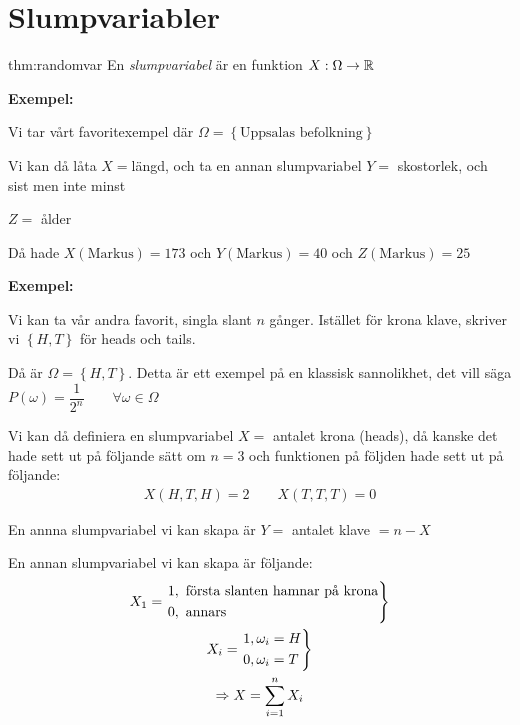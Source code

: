 \section{Slumpvariabler}
\par\bigskip
\begin{theo}[Slumpvariabel]{thm:randomvar}
  En \textit{slumpvariabel} är en funktion $X:\Omega\to\mathbb{R}$ 
\end{theo}
\par\bigskip
\noindent\textbf{Exempel:}\par
\noindent Vi tar vårt favoritexempel där $\Omega = \left\{\text{Uppsalas befolkning}\right\}$ \par
\noindent Vi kan då låta $X = $längd, och ta en annan slumpvariabel $Y = $ skostorlek, och sist men inte minst\par\noindent $Z =$ ålder\par
\noindent Då hade $X(\text{Markus}) = 173$ och $Y(\text{Markus}) = 40$ och $Z(\text{Markus})=25$
\par\bigskip
\noindent\textbf{Exempel:}\par
\noindent Vi kan ta vår andra favorit, singla slant $n$ gånger. Istället för krona klave, skriver vi $\left\{H,T\right\}$ för heads och tails.\par
\noindent Då är $\Omega = \left\{H,T\right\}$. Detta är ett exempel på en klassisk sannolikhet, det vill säga $P(\omega) = \dfrac{1}{2^n}\qquad\forall \omega\in\Omega$\par
\noindent Vi kan då definiera en slumpvariabel $X=$ antalet krona (heads), då kanske det hade sett ut på följande sätt om $n=3$ och funktionen på följden hade sett ut på följande:
\begin{equation*}
  \begin{gathered}
    X(H,T,H) = 2\qquad X(T,T,T) = 0
  \end{gathered}
\end{equation*}
\par\bigskip
\noindent En annna slumpvariabel vi kan skapa är $Y=$ antalet klave $=n-X$\par
\noindent En annan slumpvariabel vi kan skapa är följande:
\begin{equation*}
  \begin{gathered}
    X_1=
    \begin{rcases*}
      1,\text{ första slanten hamnar på krona}\\
      0, \text{ annars}
    \end{rcases*}\\
    X_i =
    \begin{rcases*}
      1, \omega_i = H\\
      0, \omega_i = T
    \end{rcases*}\\
    \Rightarrow X= \sum_{i=1}^{n}X_i
  \end{gathered}
\end{equation*}
